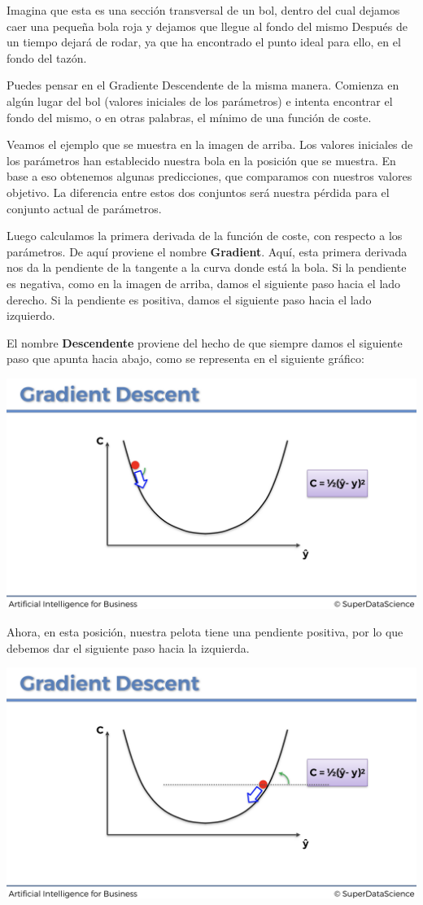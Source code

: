 \documentclass[]{book}
\begin{document}
Imagina que esta es una sección transversal de un bol, dentro del cual dejamos caer una pequeña bola roja y dejamos que llegue al fondo del mismo Después de un tiempo dejará de rodar, ya que ha encontrado el punto ideal para ello, en el fondo del tazón.

Puedes pensar en el Gradiente Descendente de la misma manera. Comienza en algún lugar del bol (valores iniciales de los parámetros) e intenta encontrar el fondo del mismo, o en otras palabras, el mínimo de una función de coste.

Veamos el ejemplo que se muestra en la imagen de arriba. Los valores iniciales de los parámetros han establecido nuestra bola en la posición que se muestra. En base a eso obtenemos algunas predicciones, que comparamos con nuestros valores objetivo. La diferencia entre estos dos conjuntos será nuestra pérdida para el conjunto actual de parámetros.

Luego calculamos la primera derivada de la función de coste, con respecto a los parámetros. De aquí proviene el nombre \textbf{Gradient}. Aquí, esta primera derivada nos da la pendiente de la tangente a la curva donde está la bola. Si la pendiente es negativa, como en la imagen de arriba, damos el siguiente paso hacia el lado derecho. Si la pendiente es positiva, damos el siguiente paso hacia el lado izquierdo.

El nombre \textbf{Descendente} proviene del hecho de que siempre damos el siguiente paso que apunta hacia abajo, como se representa en el siguiente gráfico:

\includegraphics{Images/ANN_21.png}

Ahora, en esta posición, nuestra pelota tiene una pendiente positiva, por lo que debemos dar el siguiente paso hacia la izquierda.

\includegraphics{Images/ANN_22.png}
\end{document}
